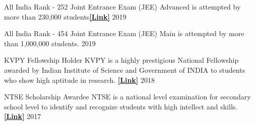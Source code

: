 
\begin{cvhonors}
  \cvhonor
    {All India Rank - 252} %
    {Joint Entrance Exam (JEE) Advanced is attempted by more than 230,000 students\href{https://jeeadv.ac.in/}{\bf [Link]}}  %
    {} %
    {2019} %
    
  \cvhonor
    {All India Rank - 454} %
    {Joint Entrance Exam (JEE) Main is attempted by more than 1,000,000 students.} %
    {} %
    {2019} %


  \cvhonor
    {KVPY Fellowship Holder} %
    {KVPY is a highly prestigious National Fellowship awarded by Indian Institute of Science and Government of INDIA to students who show high aptitude in research. \href{http://www.kvpy.iisc.ernet.in/main/index.htm}{\bf [Link]}} %
    {} %
    {2018} %

  \cvhonor
    {NTSE Scholarship Awardee} %
    {NTSE is a national level examination for secondary school level to identify and recognize students with high intellect and skills. \href{http://www.ncert.nic.in/programmes/talent_exam/index_talent.html}{\bf [Link]}} %
    {} %
    {2017} %




\end{cvhonors}